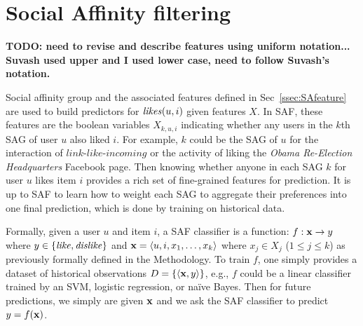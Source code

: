 
\section{Social Affinity filtering}

{\bf TODO: need to revise and describe features using uniform notation... Suvash used upper and I used lower case, need to follow Suvash's notation.}

Social affinity group and the associated features defined in Sec~\ref{ssec:SAfeature} 
are used to build predictors for $\likes(u,i)$ given features $X$.
In SAF, these features are the boolean
variables $X_{k,u,i}$ indicating whether any users in the $k$th SAG of
user $u$ also liked $i$.  For example, $k$ could be the SAG of $u$ for
the interaction of $\textit{link-like-incoming}$ or the activity of
liking the {\em Obama Re-Election Headquarters} Facebook page.  Then knowing whether
anyone in each SAG $k$ for user $u$ likes item $i$ provides a rich set
of fine-grained features for prediction.  It is up to SAF to learn how
to weight each SAG to aggregate their preferences into one final
prediction, which is done by training on historical data.

Formally, given a user $u$ and item $i$, a SAF classifier is a
function: $f: \x \to y$ where $y \in \{ \like, \dislike \}$ and $\x =
\langle u,i,x_1,\ldots,x_k \rangle$ where $x_j \in X_j$ ($1 \leq j
\leq k$) as previously formally defined in the Methodology.  To train $f$, one
simply provides a dataset of historical observations $D = \{ \langle
\x,y \rangle \}$, e.g., $f$ could be a linear classifier trained by an
SVM, logistic regression, or na\"{i}ve Bayes.  Then for future
predictions, we simply are given $\x$ and we ask the SAF classifier to
predict $y = f(\x)$.

